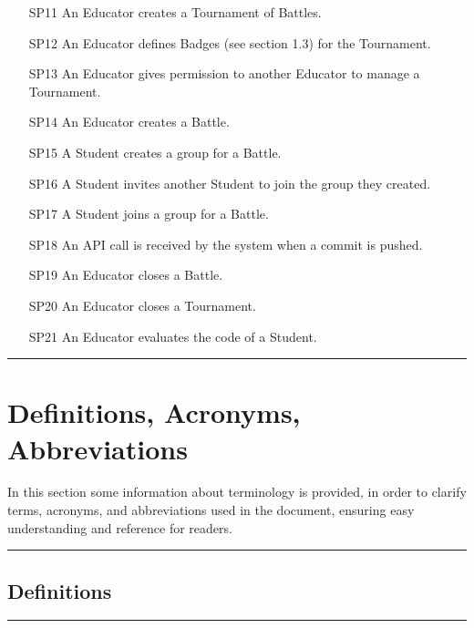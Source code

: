 \documentclass{Configuration_Files/Template}
\begin{document}
\begin{enumerate}
    \item[\textcolor{bluepoli}{SP11}] An Educator creates a Tournament of Battles.
    \item[\textcolor{bluepoli}{SP12}] An Educator defines Badges (see section 1.3) for the Tournament.
    \item[\textcolor{bluepoli}{SP13}] An Educator gives permission to another Educator to manage a Tournament.
    \item[\textcolor{bluepoli}{SP14}] An Educator creates a Battle.
    \item[\textcolor{bluepoli}{SP15}] A Student creates a group for a Battle.
    \item[\textcolor{bluepoli}{SP16}] A Student invites another Student to join the group they created.
    \item[\textcolor{bluepoli}{SP17}] A Student joins a group for a Battle.
    \item[\textcolor{bluepoli}{SP18}] An API call is received by the system when a commit is pushed.
    \item[\textcolor{bluepoli}{SP19}] An Educator closes a Battle.
    \item[\textcolor{bluepoli}{SP20}] An Educator closes a Tournament.
    \item[\textcolor{bluepoli}{SP21}] An Educator evaluates the code of a Student.
\end{enumerate}

{\color{bluepoli}\rule{\linewidth}{0.1pt}}

\section{Definitions, Acronyms, Abbreviations}

In this section some information about terminology is provided, in order to clarify terms, acronyms, and abbreviations used in the document, ensuring easy understanding and reference for readers.

{\color{bluepoli}\rule{\linewidth}{0.1pt}}

\subsection{Definitions}

{\color{bluepoli}\rule{\linewidth}{0.1pt}}
\end{document}
